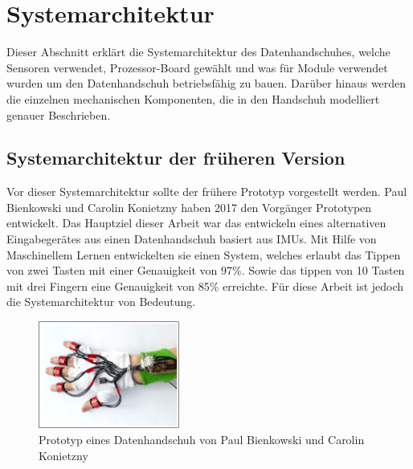 \chapter{Systemarchitektur}
Dieser Abschnitt erklärt die Systemarchitektur des Datenhandschuhes, welche Sensoren verwendet, Prozessor-Board gewählt und was für Module verwendet wurden um den Datenhandschuh betriebsfähig zu bauen. Darüber hinaus werden die einzelnen mechanischen Komponenten, die in den Handschuh modelliert genauer Beschrieben.

\section{Systemarchitektur der früheren Version}
Vor dieser Systemarchitektur sollte der frühere Prototyp vorgestellt werden. Paul Bienkowski und Carolin Konietzny haben 2017 den Vorgänger Prototypen entwickelt. Das Hauptziel dieser Arbeit war das entwickeln eines alternativen Eingabegerätes aus einen Datenhandschuh basiert aus IMUs. Mit Hilfe von Maschinellem Lernen entwickelten sie einen System, welches erlaubt das Tippen von zwei Tasten mit einer Genauigkeit von 97\%. Sowie das tippen von 10 Tasten mit drei Fingern eine Genauigkeit von 85\% erreichte. Für diese Arbeit ist jedoch die Systemarchitektur von Bedeutung. 
\begin{figure}[h]
	\centering
    \includegraphics[height=100pt]{Bachelorarbeit/images/PaulBienkowski.png}
    \caption{Prototyp eines Datenhandschuh von Paul Bienkowski und Carolin Konietzny}
    \label{fig:Bienkowski}
\end{figure}

